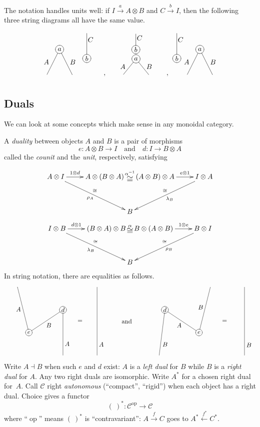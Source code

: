 \documentclass[a4paper,12pt]{article}
\theoremstyle{definition}
\theoremstyle{fact}
\theoremstyle{genquest}
\theoremstyle{step}
\newcommand{\catC}{\mathcal{C}}
\newcommand{\op}{\operatorname{op}}
\newcommand{\longto}{\longrightarrow}
\begin{document}
\goodbreak\noindent
The notation handles units well:
if $I   \stackrel{a}{\longto}   A \otimes B$ and $C \stackrel{b}{\longto}  I$, 
then the following three string diagrams all have the same value.
\[ 
\xygraph{!{0;(1.25,0):(0,.65)::} {\xybox{\xygraph{{\xybox{\xygraph{!{0;(.5,0):(0,2)::} {a} *\xycircle<6pt>{-}="m" "m"(-[dl] [l(.05)u(.5)] {A},-[dr] [r(.05)u(.5)] {B})}}} [u(.5)r(1.5)] {\xybox{\xygraph{{b} *\xycircle<6pt>{-}="m" "m" -[u] [r(.15)d(.25)] {C}}}}}}}
[dr] {,} [ur]
{\xybox{\xygraph{{\xybox{\xygraph{!{0;(.5,0):(0,1.24)::} {a} *\xycircle<6pt>{-}="m" "m"(-[dl] [l(.05)u(.5)] {A},-[dr] [r(.05)u(.5)] {B})}}} [u(.61)r(.41)] {\xybox{\xygraph{!{0;(1,0):(0,.62)::} {b} *\xycircle<6pt>{-}="m" "m" -[u] [r(.15)d(.25)] {C}}}}}}}
[dr] {,} [ur]
{\xybox{\xygraph{{\xybox{\xygraph{!{0;(.5,0):(0,2)::} {a} *\xycircle<6pt>{-}="m" "m"(-[dl] [l(.05)u(.5)] {A},-[dr] [r(.05)u(.5)] {B})}}} [u(.5)l(.5)] {\xybox{\xygraph{{b} *\xycircle<6pt>{-}="m" "m" -[u] [r(.15)d(.25)] {C}}}}}}}} 
\]

\subsection{Duals}

We can look at some concepts which make sense in any monoidal category.

\medskip\noindent
A \emph{duality} between objects $A$ and $B$ is a pair of morphisms
\[
e : A \otimes B \longto I  \quad \mbox{and} \quad d : I \longto B \otimes A
\]
called the \textit{counit} and the \textit{unit}, respectively, satisfying

\[
 \xymatrix @R+3mm {
 A \otimes I \ar[r]^-{1\otimes d} \ar[rd]_{\rho_A}^\cong 
 & A \otimes (B\otimes A) {\alpha^{-1} \atop {\mbox{\large $\cong$}}}  (A\otimes B)\otimes A \ar[r]^-{e\otimes 1}
 & I \otimes A \ar[ld]^{\lambda_B}_\cong \\
 & B }
\]
\[
 \xymatrix@R+3mm {
 I \otimes B \ar[r]^-{d\otimes 1} \ar[rd]_{\lambda_B}^\cong 
 & (B\otimes A) \otimes B {\alpha \atop {\mbox{\large $\cong$}}}  B\otimes (A\otimes B)\ar[r]^-{1\otimes e}
 & B \otimes I \ar[ld]^{\rho_B}_\cong \\
 & B }
\]
In string notation, there are equalities as follows.
\[ 
\xygraph{!{0;(2.6,0):(0,.5)::} {\xybox{\xygraph{{e} *\xycircle{-}="e" [r(1.5)u] {d} *\xycircle{-}="a" "e"(-[u(2)l(.5)]^-*{A},-"a"_-*{B}-[d(2)]^(.75)*{A} [r(1.5)] -[u(3)]_(.16)*{A}) "a" [r(.75)d(.5)] {=}}}}  
 [r(1.2)] *\txt{and} [r(1.2)]
{\xybox{\xygraph{{d} *\xycircle{-}="a" [r(1.5)d] {e} *\xycircle{-}="e" "a"(-[d(2)l(.25)]^(.75)*{B},-"e"_-*{A}-[u(2)r(.5)]^-*{B} [r(1.5)] -[d(3)]^(.85)*{B}) "e" [r(1.125)u(.5)] {=}}}}} 
\]
Write $A \dashv B$  when such $e$ and $d$ exist: $A$ is a \emph{left dual} for $B$ while $B$ is a \emph{right dual} for $A$. 
Any two right duals are isomorphic. Write $A^\ast$ for a chosen right dual for~$A$. 
Call $\catC$ right \emph{autonomous} (``compact'', ``rigid'') when each object has a right dual. 
Choice gives a functor
\[
( \ )^\ast : \catC^{\op}   \longto \catC
\]
where ``$\op$'' means $( \ )^\ast$ is ``contravariant'': 
$A \stackrel{f}{\longto} C$ goes to  $A^\ast \stackrel{\ f^\ast}{\longleftarrow} C^\ast $.
\end{document}

